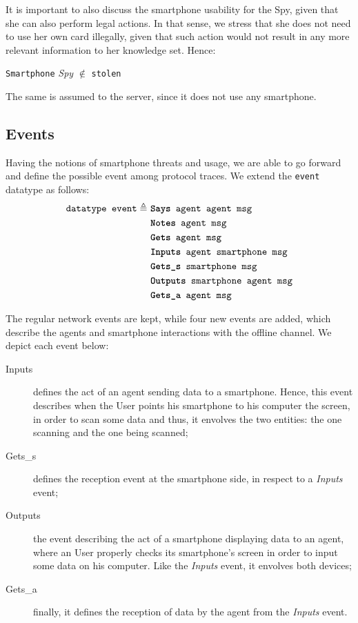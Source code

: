 It is important to also discuss the smartphone usability for the Spy, given that she can also perform legal actions. In that sense, we stress that she does not need to use her own card illegally, given that such action would not result in any more relevant information to her knowledge set. Hence:
%
\begin{center}
  \texttt{Smartphone} \textit{Spy} $\notin$ \texttt{stolen}
\end{center}
%
The same is assumed to the server, since it does not use any smartphone.





\subsection{Events}
Having the notions of smartphone threats and usage, we are able to go forward and define the possible event among protocol traces. We extend the \texttt{event} datatype as follows:
%
\begin{equation*}
  \begin{split}
    \texttt{datatype event} \triangleq \
    & \texttt{\textbf{Says} agent agent msg} \\
    & \texttt{\textbf{Notes} agent msg} \\
    & \texttt{\textbf{Gets} agent msg} \\
    & \texttt{\textbf{Inputs} agent smartphone msg} \\
    & \texttt{\textbf{Gets\_s} smartphone msg} \\
    & \texttt{\textbf{Outputs} smartphone agent msg} \\
    & \texttt{\textbf{Gets\_a} agent msg}
  \end{split}
\end{equation*}

The regular network events are kept, while four new events are added, which describe the agents and smartphone interactions with the offline channel. We depict each event below:

\begin{description}
  \item[Inputs] defines the act of an agent sending data to a smartphone. Hence, this event describes when the User points his smartphone to his computer the screen, in order to scan some data and thus, it envolves the two entities: the one scanning and the one being scanned;

  \item[Gets\_s] defines the reception event at the smartphone side, in respect to a \textit{Inputs} event;

  \item[Outputs] the event describing the act of a smartphone displaying data to an agent, where an User properly checks its smartphone's screen in order to input some data on his computer. Like the \textit{Inputs} event, it envolves both devices;

  \item[Gets\_a] finally, it defines the reception of data by the agent from the \textit{Inputs} event.
\end{description}

